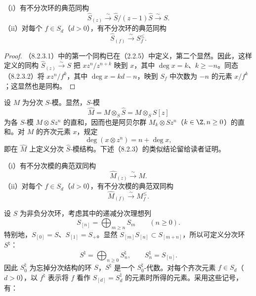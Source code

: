 （i）有不分次环的典范同构
\begin{equation}
\widehat S_{(z)}\xrightarrow{\sim}\widehat S/(z-1)\widehat S\xrightarrow{\sim}S.
\tag{8.2.3.1}
\end{equation}
（ii）对每个 $f\in S_d$（$d>0$），有不分次环的典范同构
\begin{equation}
\widehat S_{(f)}\xrightarrow{\sim}S_f^{\leq}.
\tag{8.2.3.2}
\end{equation}
\begin{proof}
（8.2.3.1）中的第一个同构已在（2.2.5）中定义，第二个显然。因此，这样定义的同构 $\widehat S_{(z)}\xrightarrow{\sim}S$ 把 $xz^n/z^{n+k}$ 映到 $x$，其中 $\deg x=k$、$k\geq-n$。同态（8.2.3.2）将 $xz^n/f^k$，其中 $\deg x=kd-n$，映到 $S_f$ 中次数为 $-n$ 的元素 $x/f^k$；这显然也是同构。
\end{proof}

设 $M$ 为分次 $S$-模。显然，$S$-模
\begin{equation}
\widehat M=M\otimes_S\widehat S=M\otimes_S S[z]
\tag{8.2.4.1}
\end{equation}
为各 $S$-模 $M\otimes Sz^n$ 的直和，因而也是阿贝尔群 $M_k\otimes Sz^n$（$k\in\Z,n\geq0$）的直和。对 $M$ 的齐次元素 $x$，规定
\begin{equation}
\deg(x\otimes z^n)=n+\deg x,
\tag{8.2.4.2}
\end{equation}
即在 $\widehat M$ 上定义分次 $\widehat S$-模结构。下述（8.2.3）的类似结论留给读者证明。

（i）有不分次模的典范双同构
\begin{equation}
\widehat M_{(z)}\xrightarrow{\sim}M.
\tag{8.2.5.1}
\end{equation}
（ii）对每个 $f\in S_d$（$d>0$），有不分次模的典范双同构
\begin{equation}
\widehat M_{(f)}\xrightarrow{\sim}M_f^{\leq}.
\tag{8.2.5.2}
\end{equation}

设 $S$ 为非负分次环，考虑其中的递减分次理想列
\begin{equation}
S_{[n]}=\bigoplus_{m\geq n}S_m\qquad(n\geq0).
\tag{8.2.6.1}
\end{equation}
特别地，$S_{[0]}=S$、$S_{[1]}=S_+$。显然 $S_{[m]}S_{[n]}\subset S_{[m+n]}$，所以可定义分次环 $S^{\natural}$：
\begin{equation}
S^{\natural}=\bigoplus_{n\geq0}S_n^{\natural},\qquad S_n^{\natural}=S_{[n]}.
\tag{8.2.6.2}
\end{equation}
因此 $S_0^{\natural}$ 为忘掉分次结构的环 $S$，$S^{\natural}$ 是一个 $S_0^{\natural}$-代数。对每个齐次元素 $f\in S_d$（$d>0$），以 $f^{\natural}$ 表示将 $f$ 看作 $S_{[d]}=S_d^{\natural}$ 的元素时所得的元素。采用这些记号，有：


